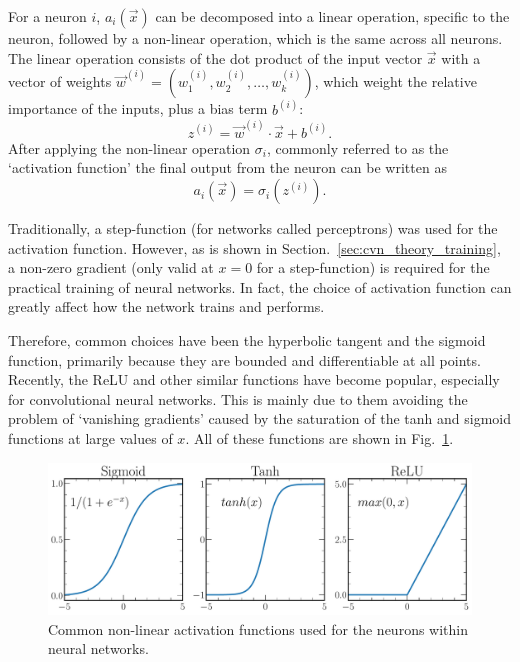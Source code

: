For a neuron $i$, $a_{i}(\vec{x})$ can be decomposed into a linear operation, specific to the
neuron, followed by a non-linear operation, which is the same across all neurons. The linear
operation consists of the dot product of the input vector $\vec{x}$ with a vector of weights
$\vec{w}^{(i)} = (w_{1}^{(i)}, w_{2}^{(i)},\dots,w_{k}^{(i)})$, which weight the relative
importance of the inputs, plus a bias term $b^{(i)}$:
\begin{equation} %
    z^{(i)}=\vec{w}^{(i)}\cdot\vec{x}+b^{(i)}.
    \label{eq:network}
\end{equation}
After applying the non-linear operation $\sigma_{i}$, commonly referred to as the `activation
function' the final output from the neuron can be written as
\begin{equation} %
    a_{i}(\vec{x})=\sigma_{i}(z^{(i)}).
    \label{eq:activation}
\end{equation}

Traditionally, a step-function (for networks called perceptrons) was used for the activation
function. However, as is shown in Section.~\ref{sec:cvn_theory_training}, a non-zero gradient
(only valid at $x=0$ for a step-function) is required for the practical training of neural
networks. In fact, the choice of activation function can greatly affect how the network trains and
performs.

Therefore, common choices have been the hyperbolic tangent and the sigmoid function, primarily
because they are bounded and differentiable at all points. Recently, the ReLU and other similar
functions have become popular, especially for convolutional neural networks. This is mainly due to
them avoiding the problem of `vanishing gradients' caused by the saturation of the tanh and
sigmoid functions at large values of $x$. All of these functions are shown in
Fig.~\ref{fig:activations}.

\begin{figure} %
    \includegraphics[width=\textwidth]{diagrams/6-cvn/activations.pdf}
    \caption[Common non-linear activation functions.]
    {Common non-linear activation functions used for the neurons within neural networks.}
    \label{fig:activations}
\end{figure}

